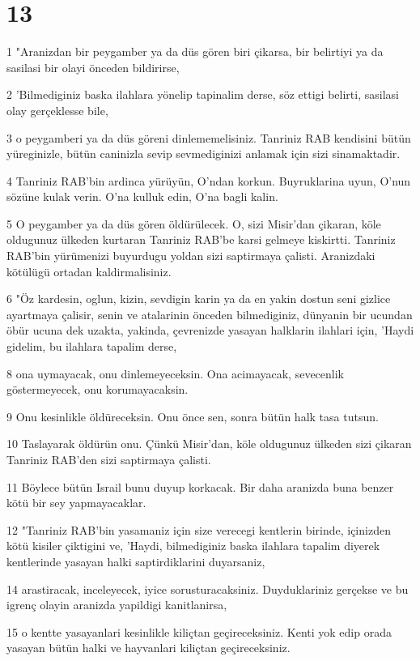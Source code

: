 \chapter{13}

\par 1 "Aranizdan bir peygamber ya da düs gören biri çikarsa, bir belirtiyi ya da sasilasi bir olayi önceden bildirirse,
\par 2 'Bilmediginiz baska ilahlara yönelip tapinalim derse, söz ettigi belirti, sasilasi olay gerçeklesse bile,
\par 3 o peygamberi ya da düs göreni dinlememelisiniz. Tanriniz RAB kendisini bütün yüreginizle, bütün caninizla sevip sevmediginizi anlamak için sizi sinamaktadir.
\par 4 Tanriniz RAB'bin ardinca yürüyün, O'ndan korkun. Buyruklarina uyun, O'nun sözüne kulak verin. O'na kulluk edin, O'na bagli kalin.
\par 5 O peygamber ya da düs gören öldürülecek. O, sizi Misir'dan çikaran, köle oldugunuz ülkeden kurtaran Tanriniz RAB'be karsi gelmeye kiskirtti. Tanriniz RAB'bin yürümenizi buyurdugu yoldan sizi saptirmaya çalisti. Aranizdaki kötülügü ortadan kaldirmalisiniz.
\par 6 "Öz kardesin, oglun, kizin, sevdigin karin ya da en yakin dostun seni gizlice ayartmaya çalisir, senin ve atalarinin önceden bilmediginiz, dünyanin bir ucundan öbür ucuna dek uzakta, yakinda, çevrenizde yasayan halklarin ilahlari için, 'Haydi gidelim, bu ilahlara tapalim derse,
\par 8 ona uymayacak, onu dinlemeyeceksin. Ona acimayacak, sevecenlik göstermeyecek, onu korumayacaksin.
\par 9 Onu kesinlikle öldüreceksin. Onu önce sen, sonra bütün halk tasa tutsun.
\par 10 Taslayarak öldürün onu. Çünkü Misir'dan, köle oldugunuz ülkeden sizi çikaran Tanriniz RAB'den sizi saptirmaya çalisti.
\par 11 Böylece bütün Israil bunu duyup korkacak. Bir daha aranizda buna benzer kötü bir sey yapmayacaklar.
\par 12 "Tanriniz RAB'bin yasamaniz için size verecegi kentlerin birinde, içinizden kötü kisiler çiktigini ve, 'Haydi, bilmediginiz baska ilahlara tapalim diyerek kentlerinde yasayan halki saptirdiklarini duyarsaniz,
\par 14 arastiracak, inceleyecek, iyice sorusturacaksiniz. Duyduklariniz gerçekse ve bu igrenç olayin aranizda yapildigi kanitlanirsa,
\par 15 o kentte yasayanlari kesinlikle kiliçtan geçireceksiniz. Kenti yok edip orada yasayan bütün halki ve hayvanlari kiliçtan geçireceksiniz.
